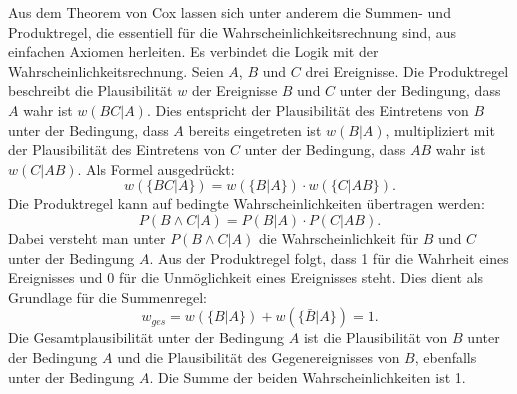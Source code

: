 Aus dem Theorem von Cox lassen sich unter anderem die Summen- und Produktregel, die essentiell für die Wahrscheinlichkeitsrechnung sind, aus einfachen Axiomen herleiten.
Es verbindet die Logik mit der Wahrscheinlichkeitsrechnung. Seien $A$, $B$ und $C$ drei Ereignisse.
Die Produktregel beschreibt die Plausibilität $w$ der Ereignisse $B$ und $C$ unter der Bedingung, dass $A$ wahr ist $w(BC|A)$. Dies entspricht der Plausibilität des Eintretens von $B$ unter der Bedingung, dass $A$ bereits eingetreten ist $w(B|A)$, 
multipliziert mit der Plausibilität des Eintretens von $C$ unter der Bedingung, dass $AB$ wahr ist $w(C|AB)$. Als Formel ausgedrückt:
\begin{equation}
    w(\{BC|A\})=w(\{B|A\})\cdot w(\{C|AB\}) .
\end{equation}
Die Produktregel kann auf bedingte Wahrscheinlichkeiten übertragen werden:
\begin{equation}
P(B \wedge C|A) = P(B|A)\cdot P(C|AB).
\end{equation}
Dabei versteht man unter $P(B \wedge C|A)$ die Wahrscheinlichkeit für $B$ und $C$ unter der Bedingung $A$.
Aus der Produktregel folgt, dass 1 für die Wahrheit eines Ereignisses und 0 für die Unmöglichkeit eines Ereignisses steht. Dies dient als Grundlage für die Summenregel:
\begin{equation}
    w_{ges}=w(\{B|A\}) + w(\{\bar{B}|A\})= 1 .
\end{equation}
Die Gesamtplausibilität unter der Bedingung $A$ ist die Plausibilität von $B$ unter der Bedingung $A$ 
und die Plausibilität des Gegenereignisses von $B$, ebenfalls unter der Bedingung $A$. Die Summe der beiden Wahrscheinlichkeiten ist 1.
